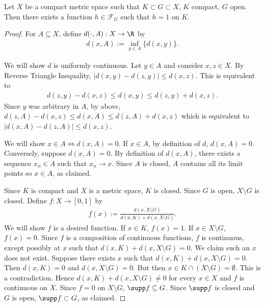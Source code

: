 \begin{lemma}
\label{lemma:fcs:sepfn}
Let $X$ be a compact metric space such that $K \subset G \subset X$, $K$ compact, $G$ open.
Then there exists a function $h \in \mathcal{F}_{G}$ such that $h = 1$ on $K$.
\end{lemma}
\begin{proof}
For $A \subseteq X$, define $d(\cdot, A) : X \to \R$ by \begin{align*}
    d(x, A) := \inf_{y \in A} \{ d(x,y) \}.
\end{align*}

We will show $d$ is uniformly continuous. Let $y \in A$ and consider $x, z \in X$. By Reverse Triangle Inequality, $|d(x, y) - d(z, y)| \leq d(x,z)$. This is equivalent to \begin{align*}
    d(z, y) - d(x, z) \leq d(x,y) \leq d(z,y) + d(x,z).
\end{align*}
Since $y$ was arbitrary in $A$, by above, $d(z,A) - d(x, z) \leq d(x,A) \leq d(z, A) + d(x,z)$ which is equivalent to $|d(x, A) - d(z, A)| \leq d(x, z)$.

We will show $x \in A \iff d(x, A) = 0$. If $x \in A$, by definition of $d$, $d(x,A) = 0$.
Conversely, suppose $d(x,A) = 0$. By definition of $d(x, A)$, there exists a sequence $x_n \in A$ such that $x_n \to x$. Since $A$ is closed, $A$ contains all its limit points so $x \in A$, as claimed. 

Since $K$ is compact and $X$ is a metric space, $K$ is closed. Since $G$ is open, $X \setminus G$ is closed. Define $f : X \to [0,1]$ by 
\begin{align*}
    f(x) := \frac{d(x,X \setminus G)}{d(x,K) + d (x, X \setminus G)}.
\end{align*}
We will show $f$ is a desired function. If $x \in K$, $f(x) = 1$. If $x \in X \setminus G$, $f(x) = 0$.
Since $f$ is a composition of continuous functions, $f$ is continuous, except possibly at $x$ such that $d(x,K) + d (x, X \setminus G) = 0$. We claim such an $x$ does not exist. Suppose there exists $x$ such that $d(x,K) + d (x, X \setminus G) = 0$. Then $d(x,K) = 0$ and $d(x, X \setminus G) = 0$. But then $x \in K \cap (X \setminus G) = \emptyset$. This is a contradiction. Hence $d(x,K) + d (x, X \setminus G) \neq 0$ for every $x \in X$ and $f$ is continuous on $X$.
Since $f = 0$ on $X \setminus G$, $\supp f \subseteq G$. Since $\supp f$ is closed and $G$ is open, $\supp f \subset G$, as claimed.
\end{proof}